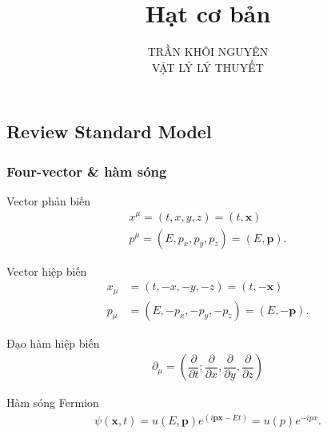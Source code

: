 \documentclass{report}
\title{\Huge{Hạt cơ bản}}
\newcommand{\f}[2]{\dfrac{#1}{#2}}
\begin{document}
\setlength{\parindent}{20pt}
\newpage
\author{TRẦN KHÔI NGUYÊN \\ VẬT LÝ LÝ THUYẾT}
\maketitle
\newpage
\subsection*{Review Standard Model}
\subsubsection*{Four-vector \& hàm sóng}
Vector phản biến
\begin{align*}
	x^{\mu} = (t,x,y,z) = (t,\mathbf{x}) \\
	p^{\mu} = (E, p_x , p_y , p_z) = (E , \mathbf{p}).
\end{align*}

Vector hiệp biến
\begin{align*}
	x_{\mu} &= (t,-x,-y,-z) = (t,-\mathbf{x}) \\
	p_{\mu} &= (E, -p_x , -p_y , -p_z) = (E , -\mathbf{p}).
\end{align*}

Đạo hàm hiệp biến
\begin{align*}
	\partial_{\mu} = \left( \f{\partial}{\partial t}; \f{\partial}{\partial x} , \f{\partial}{\partial y} , \f{\partial}{\partial z} \right)
\end{align*}

Hàm sóng Fermion
\begin{align*}
	\psi(\mathbf{x},t) = u (E,\mathbf{p}) e^{(i\mathbf{px} -Et)} = u(p) e^{-i p x}.
\end{align*}
\end{document}
